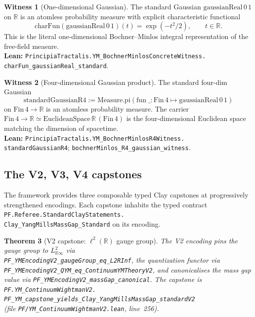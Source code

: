 \documentclass[11pt,a4paper]{article}
\theoremstyle{plain}
\newtheorem{theorem}{Theorem}[section]
\theoremstyle{definition}
\newtheorem{witness}[theorem]{Witness}
\newcommand{\R}{\mathbb{R}}
\begin{document}
\begin{witness}[One-dimensional Gaussian]
\label{wit:gaussian1d}
The standard Gaussian $\mathrm{gaussianReal}\,0\,1$ on $\R$ is an
atomless probability measure with explicit characteristic functional
\[
\mathrm{charFun}(\mathrm{gaussianReal}\,0\,1)(t) = \exp(-t^{2}/2),
\qquad t \in \R.
\]
This is the literal one-dimensional Bochner--Minlos integral
representation of the free-field measure.\\
\textbf{Lean:}
\texttt{PrincipiaTractalis.YM\_BochnerMinlosConcreteWitness.\\
charFun\_gaussianReal\_standard}.
\end{witness}

\begin{witness}[Four-dimensional Gaussian product]
\label{wit:gaussian4d}
The standard four-dim Gaussian
\[
\mathrm{standardGaussianR4} := \mathrm{Measure.pi}(\mathrm{fun}\;
\_:\mathrm{Fin}\,4 \mapsto \mathrm{gaussianReal}\,0\,1)
\]
on $\mathrm{Fin}\,4 \to \R$ is an atomless probability measure. The
carrier $\mathrm{Fin}\,4 \to \R \simeq
\mathrm{EuclideanSpace}\,\R\,(\mathrm{Fin}\,4)$ is the
four-dimensional Euclidean space matching the dimension of
spacetime.\\
\textbf{Lean:}
\texttt{PrincipiaTractalis.YM\_BochnerMinlosR4Witness.\\
standardGaussianR4};
\texttt{bochnerMinlos\_R4\_gaussian\_witness}.
\end{witness}

\subsection{The V2, V3, V4 capstones}

The framework provides three composable typed Clay capstones at
progressively strengthened encodings. Each capstone inhabits the
typed contract \texttt{PF.Referee.StandardClayStatements.\\
Clay\_YangMillsMassGap\_Standard} on its encoding.

\begin{theorem}[V2 capstone: $\ell^{2}(\R)$ gauge group]
\label{thm:v2capstone}
The V2 encoding pins the gauge group to $L^{2}_{\R\infty}$ via\\
\texttt{PF\_YMEncodingV2\_gaugeGroup\_eq\_L2RInf}, the quantization
functor via \\\texttt{PF\_YMEncodingV2\_QYM\_eq\_ContinuumYMTheoryV2},
and canonicalises the mass gap value via
\texttt{PF\_YMEncodingV2\_massGap\_canonical}. The capstone is\\
\texttt{PF.YM\_ContinuumWightmanV2.\\
PF\_YM\_capstone\_yields\_Clay\_YangMillsMassGap\_standardV2}\\
(file \texttt{PF/YM\_ContinuumWightmanV2.lean}, line~256).
\end{theorem}
\end{document}
